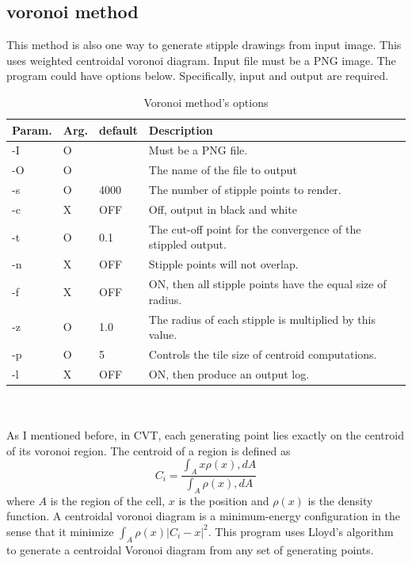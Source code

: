 \documentclass[11pt]{article}
\begin{document}
\subsection{voronoi method}
This method is also one way to generate stipple drawings from input image. This uses weighted centroidal voronoi diagram. Input file must be a PNG image. The program could have options below. Specifically, input and output are required\cite{saliences}.
\begin{table}[hbt]
\centering
\begin{tabular}{|l||l|l|l|}  
\hline
Param. & Arg. & default & Description\\
\hline\hline
-I & O &  & Must be a PNG file.\\  
\hline
-O & O &  & The name of the file to output\\
\hline
-s & O & 4000 & The number of stipple points to render.\\
\hline
-c & X & OFF & Off, output in black and white\\
\hline
-t & O & 0.1 & The cut-off point for the convergence of the stippled output.\\
\hline
-n & X & OFF & Stipple points will not overlap.\\
\hline
-f & X & OFF & ON, then all stipple points have the equal size of radius.\\
\hline
-z & O & 1.0 & The radius of each stipple is multiplied by this value.\\
\hline
-p & O & 5 & Controls the tile size of centroid computations.\\
\hline
-l & X & OFF & ON, then produce an output log.\\
\hline
\end{tabular}
\caption{Voronoi method's options}
\label{voronoimethodoptions}
\end{table}
\\ \\
As I mentioned before, in CVT, each generating point lies exactly on the centroid of its voronoi region. The centroid of a region is defined as 
\begin{equation}
C_i = \frac{\int_{A} x\rho(x), dA}{\int_{A} \rho(x), dA}
\label{eq:centroid}
\end{equation}
where $A$ is the region of the cell, $x$ is the position and $\rho(x)$ is the density function. A centroidal voronoi diagram is a minimum-energy configuration in the sense that it minimize $\int_{A}\rho(x){|C_i-x|}^2$.\cite{weighted-voronoi-stipples}
This program uses Lloyd's algorithm\cite{weighted-voronoi-stippling} to generate a centroidal Voronoi diagram from any set of generating points.
\end{document}
